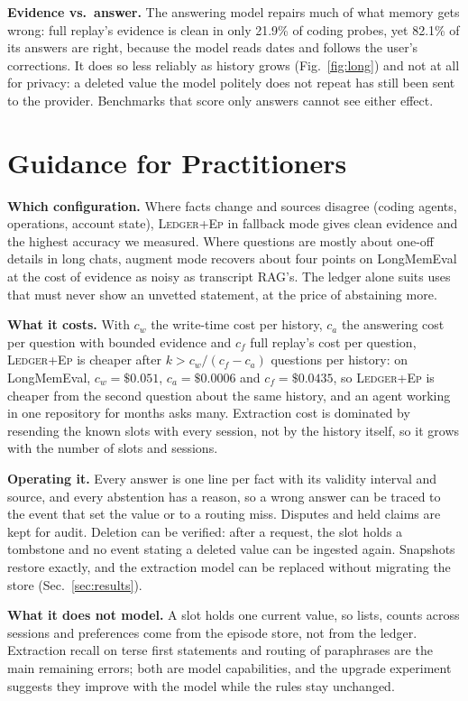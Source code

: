 \documentclass[10pt,conference]{IEEEtran}
\newcommand{\hyb}{\textsc{Ledger+Ep}}
\begin{document}
\textbf{Evidence vs.\ answer.} The answering model repairs much of what
memory gets wrong: full replay's evidence is clean in only 21.9\% of coding
probes, yet 82.1\% of its answers are right, because the model reads dates and
follows the user's corrections. It does so less reliably as history grows
(Fig.~\ref{fig:long}) and not at all for privacy: a deleted value the model
politely does not repeat has still been sent to the provider. Benchmarks that
score only answers cannot see either effect.

\section{Guidance for Practitioners}
\label{sec:guidance}

\textbf{Which configuration.} Where facts change and sources disagree (coding
agents, operations, account state), \hyb{} in fallback mode gives clean
evidence and the highest accuracy we measured. Where questions are mostly
about one-off details in long chats, augment mode recovers about four points
on LongMemEval at the cost of evidence as noisy as transcript RAG's. The
ledger alone suits uses that must never show an unvetted statement, at the
price of abstaining more.

\textbf{What it costs.} With $c_w$ the write-time cost per history, $c_a$ the
answering cost per question with bounded evidence and $c_f$ full replay's cost
per question, \hyb{} is cheaper after $k > c_w/(c_f - c_a)$ questions per
history: on LongMemEval, $c_w=\$0.051$, $c_a=\$0.0006$ and $c_f=\$0.0435$,
so \hyb{} is cheaper from the second question about the same history, and an
agent working in one repository for months asks many. Extraction cost is
dominated by resending the known slots with every session, not by the
history itself, so it grows with the number of slots and sessions.

\textbf{Operating it.} Every answer is one line per fact with its validity
interval and source, and every abstention has a reason, so a wrong answer can
be traced to the event that set the value or to a routing miss. Disputes and
held claims are kept for audit. Deletion can be verified: after a request, the
slot holds a tombstone and no event stating a deleted value can be ingested
again. Snapshots restore exactly, and the extraction model can be replaced
without migrating the store (Sec.~\ref{sec:results}).

\textbf{What it does not model.} A slot holds one current value, so lists,
counts across sessions and preferences come from the episode store, not from
the ledger. Extraction recall on terse first statements and routing of
paraphrases are the main remaining errors; both are model capabilities, and
the upgrade experiment suggests they improve with the model while the rules
stay unchanged.
\end{document}
